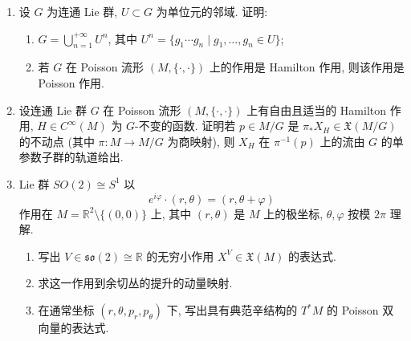 \begin{RiemannExercise}
\begin{enumerate}[label=(\arabic*),ref=\arabic*,leftmargin=*]
\begin{enumerate}[label=(\alph*),leftmargin=*]
\[\begin{array}{c|c}
    (A^{-1})^t & *
  \end{array}\right),
\]
其中 $A=A(F)$ 是由下式定义的矩阵 $A=(a_{ij})$:
\[
  X_{F_i}=\sum_{j=1}^n a_{ij}\frac{\partial}{\partial x^j};
\]
\item 可选取新坐标 $J=J(F)$, 使 $\{J_i,x^j\}=\delta_{ij}$;
\item $\{x^i,x^j\}$ 只是 $J$ 的函数;
\item 可选取新坐标 $y=x+z(J)$, 使 $\{y^i,y^j\}=0$ 且 $\{J_i,y^j\}=\delta_{ij}$;
\item 在 $T_0$ 的一个邻域中存在 1-形式 $\theta$, 使 $\omega=\mathrm{d}\theta$, 且 $J_i=\oint_{\gamma_i}\theta$, 其中 $\gamma_i$ 是 $y^i$ 轴在各不变环面 $T\cong\mathbb{R}^n/\mathbb{Z}^n$ 上的投影.

(\textbf{提示}: 将用到 Poincaré 引理 --- 参见第~\ref{chap:differential-forms}~章的 Exercise~\ref{ex:differential-forms}(\ref{ex:homotopy-operator-and-poincare-lemma}).)
\end{enumerate}
\item\label{ex:connected-hamiltonian-action-is-poisson}
设 $G$ 为连通 Lie 群, $U\subset G$ 为单位元的邻域. 证明:
\begin{enumerate}[label=(\alph*),leftmargin=*]
\item $G=\bigcup_{n=1}^{+\infty}U^n$, 其中 $U^n=\{g_1\cdots g_n\mid g_1,\ldots,g_n\in U\}$;
\item 若 $G$ 在 Poisson 流形 $(M,\{\cdot,\cdot\})$ 上的作用是 Hamilton 作用, 则该作用是 Poisson 作用.
\end{enumerate}
\item\label{ex:relative-equilibrium-on-group-orbit}
设连通 Lie 群 $G$ 在 Poisson 流形 $(M,\{\cdot,\cdot\})$ 上有自由且适当的 Hamilton 作用, $H\in C^\infty(M)$ 为 $G$-不变的函数. 证明若 $p\in M/G$ 是 $\pi_*X_H\in\mathfrak{X}(M/G)$ 的不动点 (其中 $\pi:M\to M/G$ 为商映射), 则 $X_H$ 在 $\pi^{-1}(p)$ 上的流由 $G$ 的单参数子群的轨道给出.
\item\label{ex:poisson-reduction-for-central-force}
Lie 群 $SO(2)\cong S^1$ 以
\[
  e^{i\varphi}\cdot(r,\theta)=(r,\theta+\varphi)
\]
作用在 $M=\mathbb{R}^2\setminus\{(0,0)\}$ 上, 其中 $(r,\theta)$ 是 $M$ 上的极坐标, $\theta,\varphi$ 按模 $2\pi$ 理解.
\begin{enumerate}[label=(\alph*),leftmargin=*]
\item 写出 $V\in\mathfrak{so}(2)\cong\mathbb{R}$ 的无穷小作用 $X^V\in\mathfrak{X}(M)$ 的表达式.
\item 求这一作用到余切丛的提升的动量映射.
\item 在通常坐标 $(r,\theta,p_r,p_\theta)$ 下, 写出具有典范辛结构的 $T^*M$ 的 Poisson 双向量的表达式.

\end{enumerate}
\end{enumerate}
\end{RiemannExercise}
